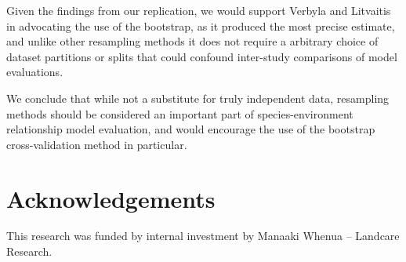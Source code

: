 \bigskip

Given the findings from our replication, we would support Verbyla and Litvaitis\supercite{verbyla-1989} 
in advocating the use of the bootstrap, as it
produced the most precise estimate, and unlike other resampling methods
it does not require a arbitrary choice of dataset partitions or splits
that could confound inter-study comparisons of model evaluations.

\bigskip

We conclude that while not a substitute for truly independent data,
resampling methods should be considered an important part of
species-environment relationship model evaluation, and would encourage
the use of the bootstrap cross-validation method in particular.

\section{Acknowledgements}

This research was funded by internal investment by Manaaki Whenua –
Landcare Research.






















